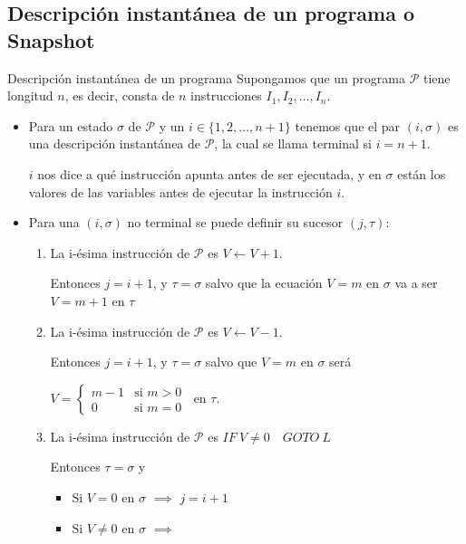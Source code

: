 \subsection{Descripción instantánea de un programa o Snapshot}

\begin{definicion}{Descripción instantánea de un programa}{}
    Supongamos que un programa $\mathcal{P}$   tiene longitud $n$, es decir,
    consta de $n$ instrucciones $I_1, I_2, \dotsc, I_n$.

    \begin{itemize}
        \item Para un estado $\sigma$ de $\mathcal{P}$ y un 
            $i \in \{ 1,2,\dotsc,n+1\}$ tenemos que el par $(i, \sigma)$ es 
            una descripción instantánea de $\mathcal{P}$, la cual se llama 
            terminal si $i = n+1$.

            $i$ nos dice a qué instrucción apunta antes de ser ejecutada, y
            en $\sigma$ están los valores de las variables antes de ejecutar
            la instrucción $i$.

        \item Para una $(i, \sigma)$ no terminal se puede definir su sucesor 
        $(j, \tau)$:
        \begin{enumerate}
            \item La i-ésima instrucción de $\mathcal{P}$ es $V \gets V+1$.

            Entonces $j = i + 1$, y $\tau = \sigma$ salvo que la ecuación 
            $V=m$ en $\sigma$ va a ser $V=m+1$ en $\tau$

            \item La i-ésima instrucción de $\mathcal{P}$ es $V\gets V-1$.

                Entonces $j= i + 1$, y $\tau = \sigma$ salvo que
                $V=m$ en $\sigma$ será 

                $V = \begin{cases}
                    m - 1 & \text{si } m > 0 \\
                    0 & \text{si } m = 0
                \end{cases} ~$ en $\tau$.
                
            \item La i-ésima instrucción de $\mathcal{P}$ es 
                $IF ~ V \neq 0 \quad GOTO ~ L$

                Entonces 
                $\tau = \sigma$ y 
                \begin{itemize}
                    \item Si $V=0$ en $\sigma$
                        $\implies$
                        $j=i+1$
                    \item Si $V \neq 0$ en $\sigma$
                        $\implies$


\end{itemize}
\end{enumerate}
\end{itemize}
\end{definicion}
